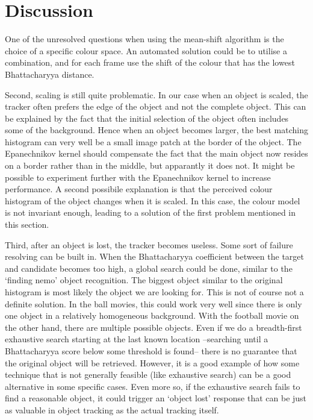 \documentclass[a4paper,11pt]{article}
\begin{document}
\section{Discussion}
\label{sec:discussion}
One of the unresolved questions when using the mean-shift algorithm is the choice of a specific colour space.
An automated solution could be to utilise a combination, and for each frame use the shift of the colour that has the lowest Bhattacharyya distance.

Second, scaling is still quite problematic.
In our case when an object is scaled, the tracker often prefers the edge of the object and not the complete object.
This can be explained by the fact that the initial selection of the object often includes some of the background.
Hence when an object becomes larger, the best matching histogram can very well be a small image patch at the border of the object.
The Epanechnikov kernel should compensate the fact that the main object now resides on a border rather than in the middle, but apparantly it does not.
It might be possible to experiment further with the Epanechnikov kernel to increase performance.
A second possibile explanation is that the perceived colour histogram of the object changes when it is scaled.
In this case, the colour model is not invariant enough, leading to a solution of the first problem mentioned in this section.

Third, after an object is lost, the tracker becomes useless.
Some sort of failure resolving can be built in.
When the Bhattacharyya coefficient between the target and candidate becomes too high, a global search could be done, similar to the `finding nemo' object recognition.
The biggest object similar to the original histogram is most likely the object we are looking for.
This is not of course not a definite solution.
In the ball movies, this could work very well since there is only one object in a relatively homogeneous background.
With the football movie on the other hand, there are multiple possible objects.
Even if we do a breadth-first exhaustive search starting at the last known location --searching until a Bhattacharyya score below some threshold is found-- there is no guarantee that the original object will be retrieved.
However, it is a good example of how some technique that is not generally feasible (like exhaustive search) can be a good alternative in some specific cases.
Even more so, if the exhaustive search fails to find a reasonable object, it could trigger an `object lost' response that can be just as valuable in object tracking as the actual tracking itself.
\end{document}
